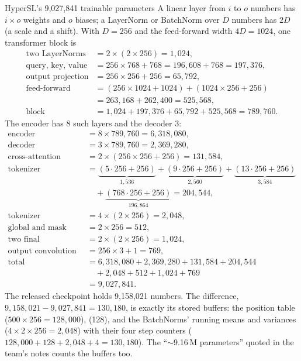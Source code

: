 \begin{worked}[label={we:hslwhat:params}]{HyperSL's 9,027,841 trainable parameters}
A linear layer from $i$ to $o$ numbers has $i\times o$ weights and $o$ biases; a LayerNorm or BatchNorm over $D$
numbers has $2D$ (a scale and a shift). With $D=256$ and the feed-forward width $4D=1024$, one transformer block is
\begin{align*}
\text{two LayerNorms} &= 2\times(2\times256) = 1{,}024,\\
\text{query, key, value} &= 256\times768+768 = 196{,}608+768 = 197{,}376,\\
\text{output projection} &= 256\times256+256 = 65{,}792,\\
\text{feed-forward} &= (256\times1024+1024)+(1024\times256+256)\\
 &= 263{,}168+262{,}400 = 525{,}568,\\
\text{block} &= 1{,}024+197{,}376+65{,}792+525{,}568 = 789{,}760 .
\end{align*}
The encoder has 8 such layers and the decoder 3:
\begin{align*}
\text{encoder} &= 8\times789{,}760 = 6{,}318{,}080,\\
\text{decoder} &= 3\times789{,}760 = 2{,}369{,}280,\\
\text{cross-attention} &= 2\times(256\times256+256) = 131{,}584,\\
\text{tokenizer convolutions} &= \underbrace{(5\cdot256+256)}_{1{,}536}+\underbrace{(9\cdot256+256)}_{2{,}560}
 +\underbrace{(13\cdot256+256)}_{3{,}584}\\
 &\quad+\underbrace{(768\cdot256+256)}_{196{,}864} = 204{,}544,\\
\text{tokenizer BatchNorms} &= 4\times(2\times256) = 2{,}048,\\
\text{global and mask tokens} &= 2\times256 = 512,\\
\text{two final LayerNorms} &= 2\times(2\times256) = 1{,}024,\\
\text{output convolution} &= 256\times3+1 = 769,\\
\text{total} &= 6{,}318{,}080+2{,}369{,}280+131{,}584+204{,}544\\
&\quad+2{,}048+512+1{,}024+769\\
&= 9{,}027{,}841 .
\end{align*}
The released checkpoint holds 9,158,021 numbers. The difference, $9{,}158{,}021-9{,}027{,}841=130{,}180$, is exactly
its stored buffers: the position table  ($500\times256=128{,}000$),  (128), and the
BatchNorms' running means and variances ($4\times2\times256=2{,}048$) with their four step counters
($128{,}000+128+2{,}048+4=130{,}180$)\tagC. The ``$\sim$9.16\,M parameters'' quoted in the team's notes counts the
buffers too.
\end{worked}

